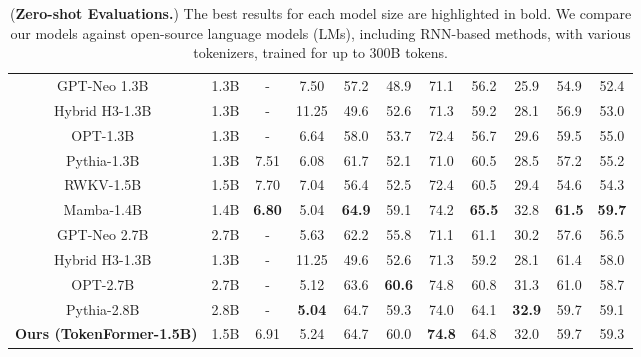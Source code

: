 \documentclass{article} %
\begin{document}
\begin{table}[t]
{\begin{tabular}{cccccccccc|c}
    \midrule
    GPT-Neo 1.3B~\citep{black2021gpt}            & 1.3B     &  -   &7.50 & 57.2 & 48.9 & 71.1 & 56.2 & 25.9 & 54.9 & 52.4 \\
    Hybrid H3-1.3B~\citep{fu2023hungry}      & 1.3B      & -   &11.25& 49.6 & 52.6& 71.3 & 59.2 & 28.1 & 56.9 & 53.0 \\
    OPT-1.3B~\citep{zhang2022opt}            & 1.3B     &  -   &6.64 & 58.0 & 53.7 & 72.4 & 56.7 & 29.6 & 59.5& 55.0 \\
    Pythia-1.3B~\citep{biderman2023pythia}			& 1.3B	   & 7.51 &6.08 & 61.7 & 52.1 & 71.0 & 60.5 &  28.5 & 57.2 & 55.2\\
    RWKV-1.5B~\citep{peng2023rwkv}			& 1.5B	   & 7.70 &7.04 & 56.4 & 52.5 & 72.4 & 60.5 &  29.4 & 54.6 & 54.3 \\
    Mamba-1.4B~\citep{mamba}  			& 1.4B	   & \textbf{6.80} & 5.04 & \textbf{64.9} & 59.1 & 74.2 & \textbf{65.5} &  32.8 & \textbf{61.5} & \textbf{59.7}\\
    GPT-Neo 2.7B~\citep{black2021gpt}            & 2.7B     &  -   &5.63 & 62.2 & 55.8 & 71.1 & 61.1 & 30.2 & 57.6 & 56.5 \\
    Hybrid H3-1.3B~\citep{fu2023hungry}       & 1.3B      & -   &11.25& 49.6 & 52.6& 71.3 & 59.2 & 28.1 & 61.4 & 58.0 \\
    OPT-2.7B~\citep{zhang2022opt}            & 2.7B     &  -   &5.12 & 63.6 & \textbf{60.6} & 74.8 & 60.8 & 31.3 & 61.0 & 58.7 \\
    Pythia-2.8B~\citep{biderman2023pythia}			& 2.8B	   & - &\textbf{5.04} & 64.7 & 59.3 & 74.0 & 64.1 &  \textbf{32.9} & 59.7 & 59.1\\
    \hline
    \textbf{Ours (TokenFormer-1.5B)}			& 1.5B	   & 6.91 & 5.24 & 64.7 & 60.0 & \textbf{74.8} & 64.8 &  32.0 & 59.7 & 59.3 \\
    \bottomrule
  \end{tabular}
  }
    \caption{(\textbf{Zero-shot Evaluations.}) The best results for each model size are highlighted in bold. We compare our models against open-source language models (LMs), including RNN-based methods, with various tokenizers, trained for up to 300B tokens. }
    \label{tab:llm_benchmark_all}
\end{table}
\end{document}
